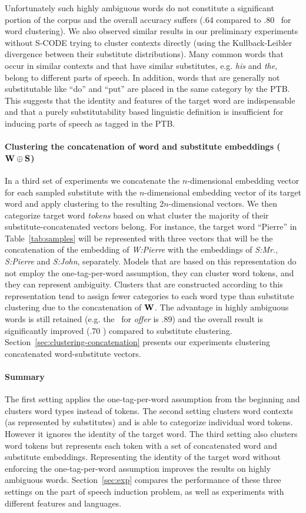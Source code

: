 Unfortunately such highly ambiguous words do not constitute a
significant portion of the corpus and the overall accuracy suffers
(.64 compared to .80 \mto\ for word clustering).  We also observed
similar results in our preliminary experiments without S-CODE trying
to cluster contexts directly (using the Kullback-Leibler divergence
between their substitute distributions).  Many common words that occur
in similar contexts and that have similar substitutes, e.g. {\em his}
and {\em the}, belong to different parts of speech.  In addition,
words that are generally not substitutable like ``do'' and ``put'' are
placed in the same category by the PTB.  This suggests that the
identity and features of the target word are indispensable and that a
purely substitutability based linguistic definition is insufficient
for inducing parts of speech as tagged in the PTB.

\paragraph{Clustering the concatenation of word and substitute 
embeddings (${\bf W\oplus S}$)} In a third set of experiments we
concatenate the $n$-dimensional embedding vector for each sampled
substitute with the $n$-dimensional embedding vector of its target
word and apply clustering to the resulting $2n$-dimensional vectors.
We then categorize target word {\em tokens} based on what cluster the
majority of their substitute-concatenated vectors belong.  For
instance, the target word ``Pierre'' in Table~\ref{tab:samples} will
be represented with three vectors that will be the concatenation of
the embedding of {\it W:Pierre} with the embeddings of {\it S:Mr.},
{\it S:Pierre} and {\it S:John}, separately.  Models that are based on
this representation do not employ the one-tag-per-word assumption,
they can cluster word tokens, and they can represent ambiguity.
Clusters that are constructed according to this representation tend to
assign fewer categories to each word type than substitute clustering due to
the concatenation of ${\bf W}$.  The advantage in highly ambiguous
words is still retained (e.g. the \mto\ for {\em offer} is .89) and
the overall result is significantly improved (.70 \mto) compared to
substitute clustering.
Section~\ref{sec:clustering-concatenation} presents our experiments
clustering concatenated word-substitute vectors.

\paragraph{Summary} The first setting applies the one-tag-per-word
assumption from the beginning and clusters word types instead of
tokens.  The second setting clusters word contexts (as represented by
substitutes) and is able to categorize individual word tokens.
However it ignores the identity of the target word.  The third setting
also clusters word tokens but represents each token with a set of
concatenated word and substitute embeddings.  Representing the
identity of the target word without enforcing the one-tag-per-word
assumption improves the results on highly ambiguous words.
Section~\ref{sec:exp} compares the performance of these three settings
on the part of speech induction problem, as well as experiments with
different features and languages.
